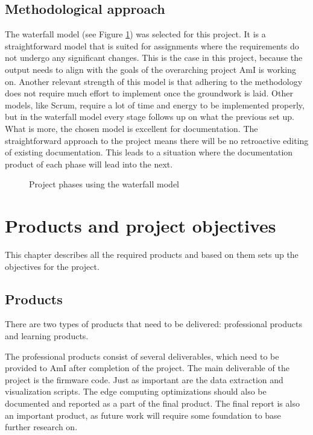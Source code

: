 \documentclass{report}
\begin{document}
	\section{Methodological approach}\label{methodological_approach}
	The waterfall model (see Figure \ref{phases}) was selected for this project. It is a straightforward model that is suited for assignments where the requirements do not undergo any significant changes. This is the case in this project, because the output needs to align with the goals of the overarching project AmI is working on. Another relevant strength of this model is that adhering to the methodology does not require much effort to implement once the groundwork is laid. Other models, like Scrum, require a lot of time and energy to be implemented properly, but in the waterfall model every stage follows up on what the previous set up. What is more, the chosen model is excellent for documentation. The straightforward approach to the project means there will be no retroactive editing of existing documentation. This leads to a situation where the documentation product of each phase will lead into the next. 
	
	\begin{figure}[h]
		\centering
		\caption{Project phases using the waterfall model}
		\label{phases}
	\end{figure}
	
	
	\chapter{Products and project objectives}
	This chapter describes all the required products and based on them sets up the objectives for the project.
	
	\section{Products}
	There are two types of products that need to be delivered: professional products and learning products.
	
	The professional products consist of several deliverables, which need to be provided to AmI after completion of the project. The main deliverable of the project is the firmware code. Just as important are the data extraction and visualization scripts. The edge computing optimizations should also be documented and reported as a part of the final product. The final report is also an important product, as future work will require some foundation to base further research on.
	
\end{document}
